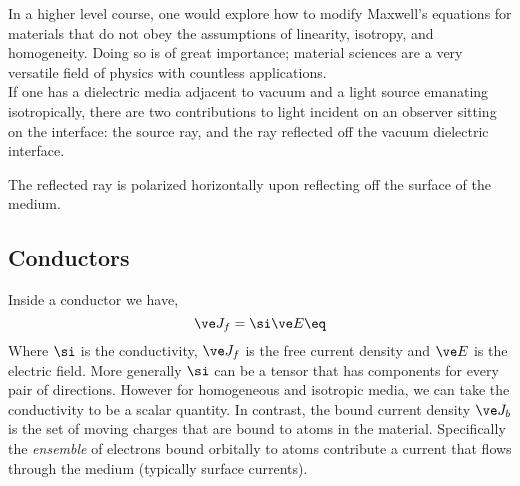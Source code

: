 \documentclass{article}
\begin{document}
In a higher level course, one would explore how to modify Maxwell's equations for materials that do not obey the assumptions of linearity, isotropy, and homogeneity. Doing so is of great importance; material sciences are a very versatile field of physics with countless applications. \\

If one has a dielectric media adjacent to vacuum and a light source emanating isotropically, there are two contributions to light incident on an observer sitting on the interface: the source ray, and the ray reflected off the vacuum dielectric interface.

\begin{center}
\end{center}

The reflected ray is polarized horizontally upon reflecting off the surface of the medium.

\subsection{Conductors}

Inside a conductor we have,
\[ \ve J_f = \si \ve E \eq \label{eq:ohms_law}\]
Where $\si$ is the conductivity, $\ve J_f$ is the free current density and $\ve E$ is the electric field. More generally $\si$ can be a tensor that has components for every pair of directions. However for homogeneous and isotropic media, we can take the conductivity to be a scalar quantity. In contrast, the bound current density $\ve J_b$ is the set of moving charges that are bound to atoms in the material. Specifically the \textit{ensemble} of electrons bound orbitally to atoms contribute a current that flows through the medium (typically surface currents).\\
\end{document}
